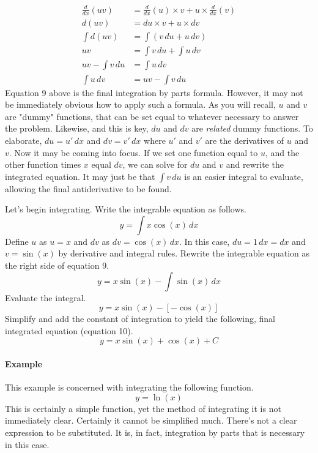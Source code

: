 \documentclass{article}
\newcounter{example}%
\newcommand{\ex}{\stepcounter{example} \paragraph{Example \theexample}}
\begin{document}
\begin{align*}
    \frac{d}{dx}(uv) &= \frac{d}{dx}(u)\times v+u\times\frac{d}{dx}(v)\\
    d(uv) &= du\times v+u\times dv\\
    \int d(uv) &= \int (v\, du+u\, dv)\\
    uv &= \int v\, du + \int u\, dv\\
    uv-\int v\, du &= \int u\, dv\\
    \int u\, dv &= uv-\int v\, du\tag{9}
\end{align*}
Equation 9 above is the final integration by parts formula. However, it may not be immediately obvious how to apply such a formula. As you will recall, $u$ and $v$ are "dummy" functions, that can be set equal to whatever necessary to answer the problem. Likewise, and this is key, $du$ and $dv$ are \emph{related} dummy functions. To elaborate, $du=u'\, dx$ and $dv=v'\, dx$ where $u'$ and $v'$ are the derivatives of $u$ and $v$. Now it may be coming into focus. If we set one function equal to $u$, and the other function times $x$ equal $dv$, we can solve for $du$ and $v$ and rewrite the integrated equation. It may just be that $\int v\, du$ is an easier integral to evaluate, allowing the final antiderivative to be found.\par
Let's begin integrating. Write the integrable equation as follows.
\begin{equation*}
    y=\int x\cos(x)\, dx
\end{equation*}
Define $u$ as $u=x$ and $dv$ as $dv=\cos(x)\, dx$. In this case, $du=1\, dx=dx$ and $v=\sin(x)$ by derivative and integral rules. Rewrite the integrable equation as the right side of equation 9.
\begin{equation*}
    y=x\sin(x)-\int \sin(x)\, dx
\end{equation*}
Evaluate the integral.
\begin{equation*}
    y=x\sin(x)-[-\cos(x)]
\end{equation*}
Simplify and add the constant of integration to yield the following, final integrated equation (equation 10).
\begin{equation}
    y=x\sin(x)+\cos(x)+C
\end{equation}
\ex This example is concerned with integrating the following function.$$y=\ln(x)$$
This is certainly a simple function, yet the method of integrating it is not immediately clear. Certainly it cannot be simplified much. There's not a clear expression to be substituted. It is, in fact, integration by parts that is necessary in this case.\par
\end{document}
